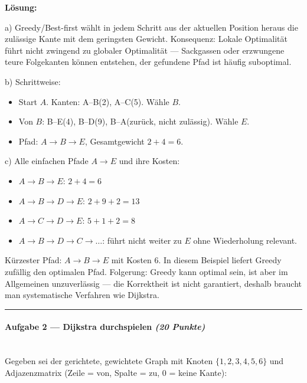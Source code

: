 \documentclass[11pt, a4paper]{article}
\begin{document}
\textbf{Lösung:}


a) Greedy/Best-first wählt in jedem Schritt aus der aktuellen Position heraus die zulässige Kante mit dem geringsten Gewicht. Konsequenz: Lokale Optimalität führt nicht zwingend zu globaler Optimalität — Sackgassen oder erzwungene teure Folgekanten können entstehen, der gefundene Pfad ist häufig suboptimal.


b) Schrittweise:

\begin{itemize}
  \item Start $A$. Kanten: A–B(2), A–C(5). Wähle $B$.
  \item Von $B$: B–E(4), B–D(9), B–A(zurück, nicht zulässig). Wähle $E$.
  \item Pfad: $A \to B \to E$, Gesamtgewicht $2 + 4 = 6$.
\end{itemize}

c) Alle einfachen Pfade $A \to E$ und ihre Kosten:

\begin{itemize}
  \item $A\to B\to E$: $2+4=6$
  \item $A\to B\to D\to E$: $2+9+2=13$
  \item $A\to C\to D\to E$: $5+1+2=8$
  \item $A\to B\to D\to C\to \dots$: führt nicht weiter zu $E$ ohne Wiederholung relevant.
\end{itemize}

Kürzester Pfad: $A\to B\to E$ mit Kosten 6. In diesem Beispiel liefert Greedy zufällig den optimalen Pfad. Folgerung: Greedy kann optimal sein, ist aber im Allgemeinen unzuverlässig — die Korrektheit ist nicht garantiert, deshalb braucht man systematische Verfahren wie Dijkstra.



\noindent\textcolor{rulegray}{\rule{\linewidth}{0.4pt}}


\paragraph{Aufgabe 2 — Dijkstra durchspielen \textit{(20 Punkte)}}\mbox{}\\[2pt]

Gegeben sei der gerichtete, gewichtete Graph mit Knoten $\{1,2,3,4,5,6\}$ und Adjazenzmatrix (Zeile = von, Spalte = zu, 0 = keine Kante):
\end{document}
